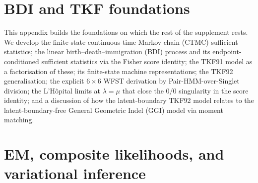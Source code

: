 \documentclass[11pt]{article}
\theoremstyle{remark}
\newcommand\insrate{\lambda}
\newcommand\delrate{\mu}
\numberwithin{equation}{section}
\numberwithin{figure}{section}
\numberwithin{table}{section}
\newcommand\demote{%
  \let\OrigSection\section
  \let\OrigSubsection\subsection
  \let\OrigSubsubsection\subsubsection
  \let\section\subsection
  \let\subsection\subsubsection
  \let\subsubsection\paragraph
}
\newcommand\restore{%
  \let\section\OrigSection
  \let\subsection\OrigSubsection
  \let\subsubsection\OrigSubsubsection
}
\begin{document}
\appendix

\section{BDI and TKF foundations}
\label{app:bdi}

This appendix builds the foundations on which the rest of the
supplement rests. We develop the finite-state continuous-time
Markov chain (CTMC) sufficient statistics; the linear
birth--death--immigration (BDI) process and its
endpoint-conditioned sufficient statistics via the Fisher score
identity; the TKF91 model as a factorisation of these; its
finite-state machine representations; the TKF92 generalisation;
the explicit $6{\times}6$ WFST derivation by Pair-HMM-over-Singlet
division; the L'H\^opital limits at
$\insrate{=}\delrate$ that close the $0/0$ singularity in the
score identity; and a discussion of how the latent-boundary TKF92
model relates to the latent-boundary-free General Geometric Indel
(GGI) model via moment matching.

\demote








\restore

\section{EM, composite likelihoods, and variational inference}
\label{app:em}
\end{document}

